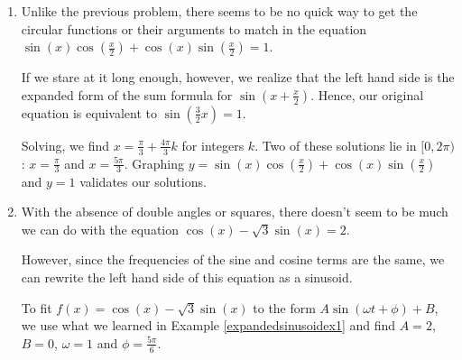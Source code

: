 \documentclass{ximera}
\begin{document}
\begin{example}
\begin{explanation}
\begin{enumerate}
We get $\cos(x) = 0$ or $\sin(x) = \frac{\sqrt{3}}{2}$. From $\cos(x) = 0$, we obtain $x = \frac{\pi}{2} + \pi k$ for integers $k$. From $\sin(x) = \frac{\sqrt{3}}{2}$, we get $x = \frac{\pi}{3} + 2\pi k$ or $x = \frac{2\pi}{3} + 2\pi k$ for integers $k$.  

 

The answers which lie in $[0,2\pi)$ are $x = \frac{\pi}{2}$, $\frac{3\pi}{2}$, $\frac{\pi}{3}$ and $\frac{2\pi}{3}$, as verified graphically below.

\begin{center}
\end{center}

\item Unlike the previous problem, there seems to be no quick way to get the circular functions or their arguments to match in the equation $\sin(x)\cos\left(\frac{x}{2}\right) + \cos(x)\sin\left(\frac{x}{2}\right) = 1$. 

 

 If we stare at it long enough, however,  we realize that the left hand side is the expanded form of the sum formula for $\sin\left(x + \frac{x}{2}\right)$.  Hence, our original equation is equivalent to  $\sin\left(\frac{3}{2} x\right) = 1$.  
 
  
 
 Solving, we find $x = \frac{\pi}{3} + \frac{4\pi}{3} k$ for integers $k$.  Two of these solutions lie in $[0,2\pi)$: $x = \frac{\pi}{3}$ and $x = \frac{5\pi}{3}$. Graphing $y = \sin(x)\cos\left(\frac{x}{2}\right) + \cos(x)\sin\left(\frac{x}{2}\right)$ and $y = 1$ validates our solutions.
 
\begin{center}
\end{center}


\item  With the absence of double angles or squares, there doesn't seem to be much we can do with the equation $\cos(x) - \sqrt{3} \sin(x) = 2$.  

 

However, since the frequencies of the sine and cosine terms are the same, we can rewrite the left hand side of this equation as a sinusoid.

 

 To fit $f(x) = \cos(x) - \sqrt{3} \sin(x)$ to the form $A\sin(\omega t + \phi) + B$, we use what we learned in Example \ref{expandedsinusoidex1} and find $A = 2$, $B = 0$, $\omega = 1$ and $\phi = \frac{5\pi}{6}$.   
 

\end{enumerate}
\end{explanation}
\end{example}
\end{document}
